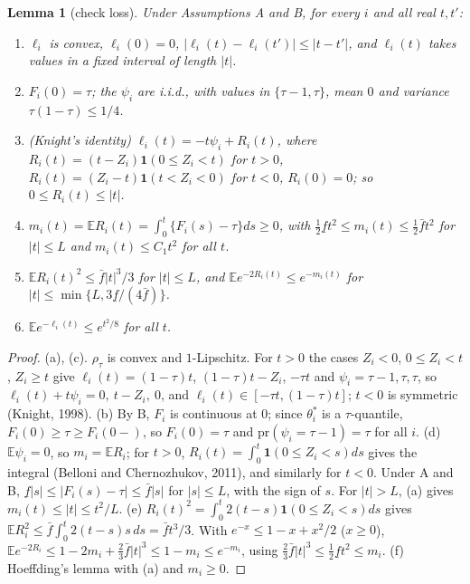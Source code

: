 \documentclass[11pt]{article}
\newtheorem{lemma}{Lemma}
\theoremstyle{definition}
\theoremstyle{remark}
\newcommand{\E}{\mathbb{E}}
\newcommand{\pr}{\mathrm{pr}}
\newcommand{\thetas}{\theta^{*}}
\newcommand{\fl}{\underline f}
\newcommand{\fu}{\bar f}
\newcommand{\ind}{\mathbf 1}
\begin{document}
\begin{lemma}[check loss]\label{lem:check}
Under Assumptions A and B, for every $i$ and all real $t,t'$:
\begin{enumerate}[label=(\alph*),itemsep=1pt,topsep=2pt]
\item $\ell_i$ is convex, $\ell_i(0)=0$, $|\ell_i(t)-\ell_i(t')|\le|t-t'|$, and $\ell_i(t)$ takes values in a fixed interval of length $|t|$.
\item $F_i(0)=\tau$; the $\psi_i$ are i.i.d., with values in $\{\tau-1,\tau\}$, mean $0$ and variance $\tau(1-\tau)\le1/4$.
\item (Knight's identity) $\ell_i(t)=-t\psi_i+R_i(t)$, where $R_i(t)=(t-Z_i)\ind(0\le Z_i<t)$ for $t>0$, $R_i(t)=(Z_i-t)\ind(t<Z_i<0)$ for $t<0$, $R_i(0)=0$; so $0\le R_i(t)\le|t|$.
\item $m_i(t)=\E R_i(t)=\int_0^t\{F_i(s)-\tau\}ds\ge0$, with $\tfrac12\fl t^2\le m_i(t)\le\tfrac12\fu t^2$ for $|t|\le L$ and $m_i(t)\le C_1t^2$ for all $t$.
\item $\E R_i(t)^2\le\fu|t|^3/3$ for $|t|\le L$, and $\E e^{-2R_i(t)}\le e^{-m_i(t)}$ for $|t|\le\min\{L,3\fl/(4\fu)\}$.
\item $\E e^{-\ell_i(t)}\le e^{t^2/8}$ for all $t$.
\end{enumerate}
\end{lemma}

\begin{proof}
(a), (c). $\rho_\tau$ is convex and $1$-Lipschitz. For $t>0$ the cases $Z_i<0$, $0\le Z_i<t$, $Z_i\ge t$ give $\ell_i(t)=(1-\tau)t$, $(1-\tau)t-Z_i$, $-\tau t$ and $\psi_i=\tau-1,\tau,\tau$, so $\ell_i(t)+t\psi_i=0,\ t-Z_i,\ 0$, and $\ell_i(t)\in[-\tau t,(1-\tau)t]$; $t<0$ is symmetric (Knight, 1998).
(b) By B, $F_i$ is continuous at $0$; since $\thetas_i$ is a $\tau$-quantile, $F_i(0)\ge\tau\ge F_i(0-)$, so $F_i(0)=\tau$ and $\pr(\psi_i=\tau-1)=\tau$ for all $i$.
(d) $\E\psi_i=0$, so $m_i=\E R_i$; for $t>0$, $R_i(t)=\int_0^t\ind(0\le Z_i<s)ds$ gives the integral (Belloni and Chernozhukov, 2011), and similarly for $t<0$. Under A and B, $\fl|s|\le|F_i(s)-\tau|\le\fu|s|$ for $|s|\le L$, with the sign of $s$. For $|t|>L$, (a) gives $m_i(t)\le|t|\le t^2/L$.
(e) $R_i(t)^2=\int_0^t2(t-s)\ind(0\le Z_i<s)ds$ gives $\E R_i^2\le\fu\int_0^t2(t-s)s\,ds=\fu t^3/3$. With $e^{-x}\le1-x+x^2/2$ ($x\ge0$),
$\E e^{-2R_i}\le1-2m_i+\tfrac23\fu|t|^3\le1-m_i\le e^{-m_i}$, using $\tfrac23\fu|t|^3\le\tfrac12\fl t^2\le m_i$.
(f) Hoeffding's lemma with (a) and $m_i\ge0$.
\end{proof}
\end{document}
